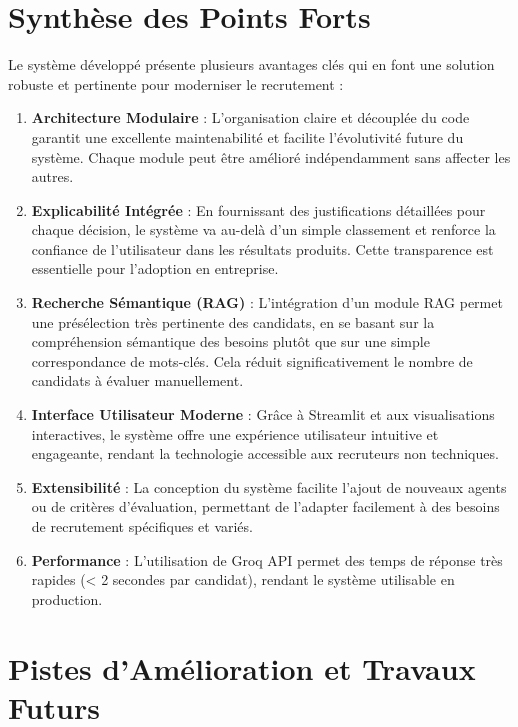 \documentclass{rapportECL}
\begin{document}
\section{Synthèse des Points Forts}

Le système développé présente plusieurs avantages clés qui en font une solution robuste et pertinente pour moderniser le recrutement :

\begin{enumerate}[leftmargin=*]
    \item \textbf{Architecture Modulaire} : L'organisation claire et découplée du code garantit une excellente maintenabilité et facilite l'évolutivité future du système. Chaque module peut être amélioré indépendamment sans affecter les autres.
    
    \item \textbf{Explicabilité Intégrée} : En fournissant des justifications détaillées pour chaque décision, le système va au-delà d'un simple classement et renforce la confiance de l'utilisateur dans les résultats produits. Cette transparence est essentielle pour l'adoption en entreprise.
    
    \item \textbf{Recherche Sémantique (RAG)} : L'intégration d'un module RAG permet une présélection très pertinente des candidats, en se basant sur la compréhension sémantique des besoins plutôt que sur une simple correspondance de mots-clés. Cela réduit significativement le nombre de candidats à évaluer manuellement.
    
    \item \textbf{Interface Utilisateur Moderne} : Grâce à Streamlit et aux visualisations interactives, le système offre une expérience utilisateur intuitive et engageante, rendant la technologie accessible aux recruteurs non techniques.
    
    \item \textbf{Extensibilité} : La conception du système facilite l'ajout de nouveaux agents ou de critères d'évaluation, permettant de l'adapter facilement à des besoins de recrutement spécifiques et variés.
    
    \item \textbf{Performance} : L'utilisation de Groq API permet des temps de réponse très rapides (< 2 secondes par candidat), rendant le système utilisable en production.
\end{enumerate}

\section{Pistes d'Amélioration et Travaux Futurs}
\end{document}
